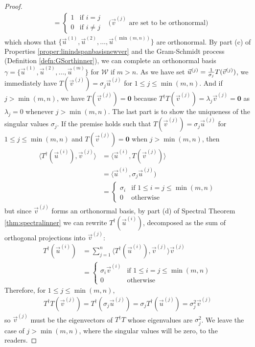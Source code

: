 \begin{proof}
\begin{align}
&= 
\begin{cases}
1 & \text{if } i = j \\
0 & \text{if } i \neq j
\end{cases}
& \text{($\vec{v}^{(j)}$ are set to be orthonormal)}
\end{align}
which shows that $\{\vec{u}^{(1)}, \vec{u}^{(2)},\ldots,\vec{u}^{(\min(m,n))}\}$ are orthonormal. By part (c) of Properties \ref{proper:linindspanbasisnewver} and the Gram-Schmidt process (Definition \ref{defn:GSorthinner}), we can complete an orthonormal basis $\gamma = \{\vec{u}^{(1)}, \vec{u}^{(2)},\ldots,\vec{u}^{(m)}\}$ for $\mathcal{W}$ if $m > n$. As we have set $\vec{u}^{(j)} = \smash{\frac{1}{\sigma_j}T(\vec{v}^{(j)})}$, we immediately have $T(\vec{v}^{(j)}) = \sigma_j\vec{u}^{(j)}$ for $1 \leq j \leq \min(m,n)$. And if $j > \min(m,n)$, we have $T(\vec{v}^{(j)}) = \textbf{0}$ because $T^\dag T(\vec{v}^{(j)}) = \lambda_j \vec{v}^{(j)} = \textbf{0}$ as $\lambda_j = 0$ whenever $j > \min(m,n)$.\footnotemark{}
The last part is to show the uniqueness of the singular values $\sigma_j$. If the premise holds such that $T(\vec{v}^{(j)}) = \sigma_j \vec{u}^{(j)}$ for $1\leq j \leq \min(m,n)$ and $T(\vec{v}^{(j)}) = \textbf{0}$ when $j > \min(m,n)$, then
\begin{align}
\langle T^\dag(\vec{u}^{(i)}), \vec{v}^{(j)} \rangle &= \langle \vec{u}^{(i)}, T(\vec{v}^{(j)}) \rangle \nonumber \\
&= \langle \vec{u}^{(i)}, \sigma_j \vec{u}^{(j)}) \nonumber \\
&= \begin{cases}
\sigma_i & \text{if } 1 \leq i = j \leq \min(m,n) \\
0 & \text{otherwise} 
\end{cases}
\end{align}
but since $\vec{v}^{(j)}$ forms an orthonormal basis, by part (d) of Spectral Theorem \ref{thm:spectralinner} we can rewrite $T^\dag (\vec{u}^{(i)})$, decomposed as the sum of orthogonal projections into $\vec{v}^{(j)}$:
\begin{align}
T^\dag (\vec{u}^{(i)}) &= \sum_{j = 1}^{n} \langle T^\dag (\vec{u}^{(i)}), \vec{v}^{(j)} \rangle \vec{v}^{(j)} \nonumber \\
&= \begin{cases}
\sigma_i\vec{v}^{(i)} & \text{if } 1 \leq i = j \leq \min(m,n) \\
0 & \text{otherwise} 
\end{cases}
\end{align}
Therefore, for $1 \leq j \leq \min(m,n)$,
\begin{align}
T^\dag T(\vec{v}^{(j)}) = T^\dag (\sigma_j \vec{u}^{(j)}) = \sigma_j T^\dag (\vec{u}^{(j)}) = \sigma_j^2 \vec{v}^{(j)}
\end{align}
so $\vec{v}^{(j)}$ must be the eigenvectors of $T^\dag T$ whose eigenvalues are $\sigma_j^2$. We leave the case of $j > \min(m,n)$, where the singular values will be zero, to the readers.
\end{proof}
